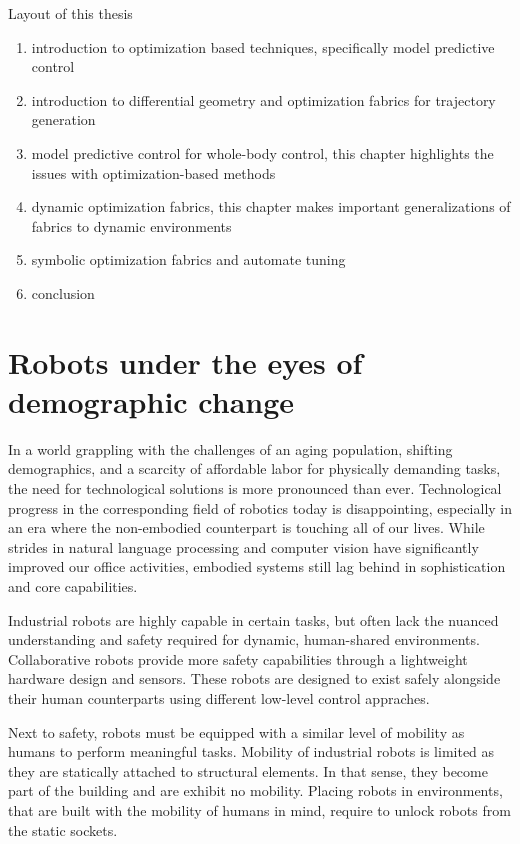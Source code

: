 Layout of this thesis
\begin{enumerate}
  \item introduction to optimization based techniques, specifically model
  predictive control
  \item introduction to differential geometry and optimization fabrics for
  trajectory generation
  \item model predictive control for whole-body control, this chapter highlights
  the issues with optimization-based methods
  \item dynamic optimization fabrics, this chapter makes important
  generalizations of fabrics to dynamic environments  
  \item symbolic optimization fabrics and automate tuning
  \item conclusion
\end{enumerate}
\fi

\section{Robots under the eyes of demographic change}

In a world grappling with the challenges of an aging
population, shifting demographics, and a scarcity of
affordable labor for physically demanding tasks, the need
for technological solutions is more pronounced than ever.
Technological progress in the corresponding field of
robotics today is disappointing, especially in an era where
the non-embodied counterpart is touching all of our lives.
While strides in natural language processing and computer
vision have significantly improved our office activities,
embodied systems still lag behind in sophistication and core
capabilities.

Industrial robots are highly capable in certain tasks, but
often lack the nuanced understanding and safety required for
dynamic, human-shared environments. Collaborative robots
provide more safety capabilities through a lightweight
hardware design and sensors. These
robots are designed to exist safely alongside their human
counterparts using different low-level control appraches.

Next to
safety, robots must be equipped with a similar level of
mobility as humans to perform meaningful tasks. Mobility of
industrial robots is limited as they are statically
attached to structural elements. In that sense, they become
part of the building and are exhibit no mobility. Placing
robots in environments, that are built with the mobility of
humans in mind, require to unlock robots from the static
sockets.

